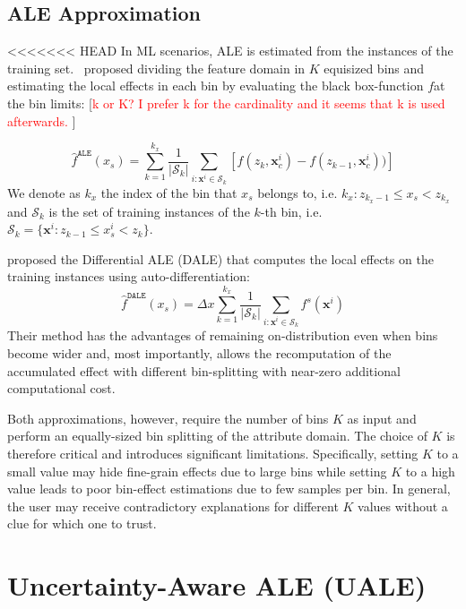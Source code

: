 \documentclass[twoside]{article}
\newcommand{\xc}{\mathbf{x}_c}
\newcommand{\xb}{\mathbf{x}}
\newcommand{\todo}[1]{[\textcolor{red}{#1}]}
\begin{document}
\subsection{ALE Approximation}
\label{sec:ale-approximation}

<<<<<<< HEAD
In ML scenarios, ALE is estimated from the instances of the training
set.~\citep{apley2020visualizing} proposed dividing the feature domain
in \(K\) equisized bins and estimating the local effects in each bin
by evaluating the black box-function \(f\)at the bin limits: \todo{k or K? I prefer k for the cardinality and it seems that k is used afterwards. }

\begin{equation}
  \label{eq:ALE_accumulated_mean_est}
  \hat{f}^{\mathtt{ALE}}(x_s) = \sum_{k=1}^{k_x} \frac{1}{|\mathcal{S}_k|} \sum_{i:\mathbf{x}^i \in
    \mathcal{S}_k} \left [ f(z_{k}, \xc^i) - f(z_{k-1}, \xc^i)) \right ]
\end{equation}
We denote as \(k_x\) the index of the bin that \(x_s\) belongs to,
i.e. \(k_x: z_{k_x-1} \leq x_s < z_{k_x} \) and \(\mathcal{S}_k\) is
the set of training instances of the \(k\)-th bin, i.e.
\( \mathcal{S}_k = \{ \xb^i : z_{k-1} \leq x^i_s < z_{k} \}
\). 

\citep{gkolemis22} proposed the Differential ALE
(DALE) that computes the local effects on the training instances using
auto-differentiation:
\begin{equation}  \label{eq:DALE_accumulated_mean_est}
  \hat{f}^{\mathtt{DALE}}(x_s) = \Delta x \sum_{k=1}^{k_x} \frac{1}{|\mathcal{S}_k|} \sum_{i:\mathbf{x}^i \in
    \mathcal{S}_k} f^s(\mathbf{x}^i)
\end{equation}
%
Their method has the advantages of remaining on-distribution even when
bins become wider and, most importantly, allows the recomputation of
the accumulated effect with different bin-splitting with near-zero additional
computational cost.

Both approximations, however, require the number of bins \(K\) as
input and perform an equally-sized bin splitting of the attribute
domain. The choice of \(K\) is therefore critical and introduces
significant limitations. Specifically, setting \(K\) to a small value
may hide fine-grain effects due to large bins while setting \(K\) to a
high value leads to poor bin-effect estimations due to few samples per
bin. In general, the user may receive contradictory explanations for
different \(K\) values without a clue for which one to trust.

\section{Uncertainty-Aware ALE (UALE)}
\label{sec:UALE}
\end{document}
